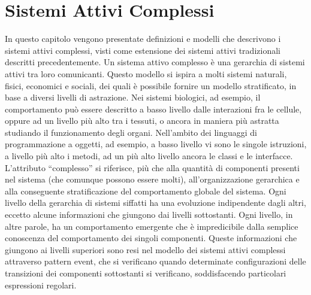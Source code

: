 \chapter{Sistemi Attivi Complessi}
In questo capitolo vengono presentate definizioni e modelli che descrivono i sistemi attivi complessi, visti come estensione dei sistemi attivi tradizionali descritti precedentemente. Un sistema attivo complesso è una gerarchia di sistemi attivi tra loro comunicanti. Questo modello si ispira a molti sistemi naturali, fisici, economici e sociali, dei quali è possibile fornire un modello stratificato, in base a diversi livelli di astrazione. Nei sistemi biologici, ad esempio, il comportamento può essere descritto a basso livello dalle interazioni fra le cellule, oppure ad un livello più alto tra i tessuti, o ancora in maniera più astratta studiando il funzionamento degli organi. Nell'ambito dei linguaggi di programmazione a oggetti, ad esempio, a basso livello vi sono le singole istruzioni, a livello più alto i metodi, ad un più alto livello ancora le classi e le interfacce. 
L'attributo ``complesso'' si riferisce, più che alla quantità di componenti presenti nel sistema (che comunque possono essere molti), all'organizzazione gerarchica e alla conseguente stratificazione del comportamento globale del sistema.
Ogni livello della gerarchia di sistemi siffatti ha una evoluzione indipendente dagli altri, eccetto alcune informazioni che giungono dai livelli sottostanti. Ogni livello, in altre parole, ha un comportamento emergente che è impredicibile dalla semplice conoscenza del comportamento dei singoli componenti. Queste informazioni che giungono ai livelli superiori sono resi nel modello dei sistemi attivi complessi attraverso pattern event, che si verificano quando determinate configurazioni delle transizioni dei componenti sottostanti si verificano, soddisfacendo particolari espressioni regolari.

\newpage
